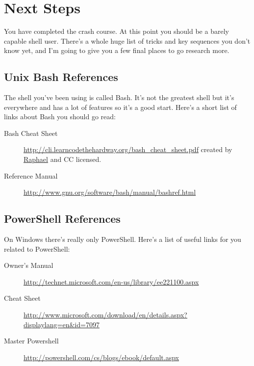 \chapter{Next Steps}

You have completed the crash course.  At this point you should be a 
barely capable shell user.  There's a whole huge list of tricks and key
sequences you don't know yet, and I'm going to give you a few final
places to go research more.

\section{Unix Bash References}

The shell you've been using is called Bash.  It's not the greatest shell
but it's everywhere and has a lot of features so it's a good start.  Here's a 
short list of links about Bash you should go read:

\begin{description}
\item[Bash Cheat Sheet] \href{http://cli.learncodethehardway.org/bash_cheat_sheet.pdf}{http://cli.learncodethehardway.org/bash\_cheat\_sheet.pdf} created by \href{http://freeworld.posterous.com/65140847}{Raphael} and CC
licensed.
\item[Reference Manual] \href{http://www.gnu.org/software/bash/manual/bashref.html}{http://www.gnu.org/software/bash/manual/bashref.html}
\end{description}


\section{PowerShell References}

On Windows there's really only PowerShell.  Here's a list of useful links for you
related to PowerShell:

\begin{description}
\item[Owner's Manual] \href{http://technet.microsoft.com/en-us/library/ee221100.aspx}{http://technet.microsoft.com/en-us/library/ee221100.aspx}
\item[Cheat Sheet] \href{http://www.microsoft.com/download/en/details.aspx?displaylang=en&id=7097}{http://www.microsoft.com/download/en/details.aspx?displaylang=en\&id=7097}
\item[Master Powershell] \href{http://powershell.com/cs/blogs/ebook/default.aspx}{http://powershell.com/cs/blogs/ebook/default.aspx}
\end{description}

